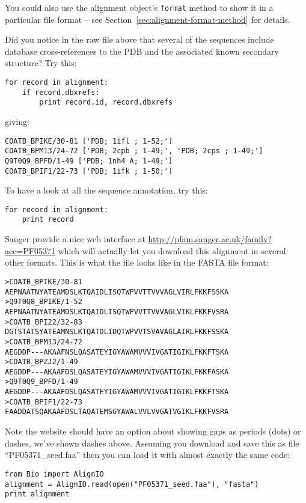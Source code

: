 \documentclass{report}
\begin{document}
You could also use the alignment object's \verb|format| method to show it in a particular file format  -- see Section~\ref{sec:alignment-format-method} for details.

Did you notice in the raw file above that several of the sequences include database cross-references to the PDB and the associated known secondary structure?  Try this:

\begin{verbatim}
for record in alignment:
    if record.dbxrefs:
        print record.id, record.dbxrefs
\end{verbatim}

\noindent giving:

\begin{verbatim}
COATB_BPIKE/30-81 ['PDB; 1ifl ; 1-52;']
COATB_BPM13/24-72 ['PDB; 2cpb ; 1-49;', 'PDB; 2cps ; 1-49;']
Q9T0Q9_BPFD/1-49 ['PDB; 1nh4 A; 1-49;']
COATB_BPIF1/22-73 ['PDB; 1ifk ; 1-50;']
\end{verbatim}

\noindent To have a look at all the sequence annotation, try this:

\begin{verbatim}
for record in alignment:
    print record
\end{verbatim}

Sanger provide a nice web interface at \url{http://pfam.sanger.ac.uk/family?acc=PF05371} which will actually let you download this alignment in several other formats.  This is what the file looks like in the FASTA file format:

\begin{verbatim}
>COATB_BPIKE/30-81
AEPNAATNYATEAMDSLKTQAIDLISQTWPVVTTVVVAGLVIRLFKKFSSKA
>Q9T0Q8_BPIKE/1-52
AEPNAATNYATEAMDSLKTQAIDLISQTWPVVTTVVVAGLVIKLFKKFVSRA
>COATB_BPI22/32-83
DGTSTATSYATEAMNSLKTQATDLIDQTWPVVTSVAVAGLAIRLFKKFSSKA
>COATB_BPM13/24-72
AEGDDP---AKAAFNSLQASATEYIGYAWAMVVVIVGATIGIKLFKKFTSKA
>COATB_BPZJ2/1-49
AEGDDP---AKAAFDSLQASATEYIGYAWAMVVVIVGATIGIKLFKKFASKA
>Q9T0Q9_BPFD/1-49
AEGDDP---AKAAFDSLQASATEYIGYAWAMVVVIVGATIGIKLFKKFTSKA
>COATB_BPIF1/22-73
FAADDATSQAKAAFDSLTAQATEMSGYAWALVVLVVGATVGIKLFKKFVSRA
\end{verbatim}

\noindent Note the website should have an option about showing gaps as periods (dots) or dashes, we've shown dashes above.  Assuming you download and save this as file ``PF05371\_seed.faa'' then you can load it with almost exactly the same code:

\begin{verbatim}
from Bio import AlignIO
alignment = AlignIO.read(open("PF05371_seed.faa"), "fasta")
print alignment
\end{verbatim}
\end{document}
